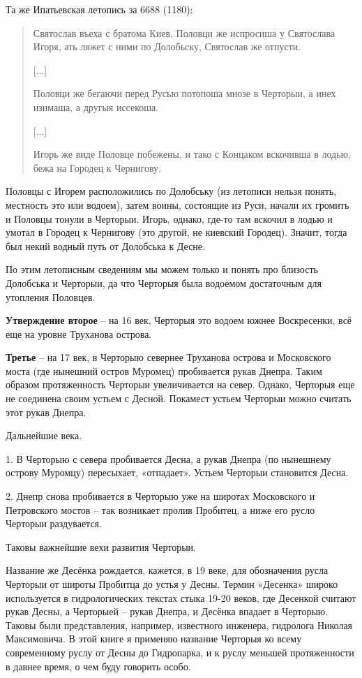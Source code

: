 Та же Ипатьевская летопись за 6688 (1180):

\begin{quotation}
Святослав въеха с братома  Киев. Половци же испросиша у Святослава Игоря, ать ляжет с ними по Долобьску, Святослав же отпусти.

[...]

Половци же бегаючи перед Русью потопоша мнозе в Черторыи, а инех изимаша, а другыя иссекоша.

[...]

Игорь же виде Половце побежены, и тако с Концаком вскочивша в лодью, бежа на Городец к Чернигову.\end{quotation}

Половцы с Игорем расположились по Долобську (из летописи нельзя понять, местность это или водоем), затем воины, состоящие из Руси, начали их громить и Половцы тонули в Черторыи. Игорь, однако, где-то там вскочил в лодью и умотал в Городец к Чернигову (это другой, не киевский Городец). Значит, тогда был некий водный путь от Долобська к Десне.

По этим летописным сведениям мы можем только и понять про близость Долобська и Черторыи, да что Черторыя была водоемом достаточным для утопления Половцев. %

\textbf{Утверждение второе} – на 16 век, Черторыя это водоем южнее Воскресенки, всё еще на уровне Труханова острова.

\textbf{Третье} – на 17 век, в Черторыю севернее Труханова острова и Московского моста (где нынешний остров Муромец) пробивается рукав Днепра. Таким образом протяженность Черторыи увеличивается на север. Однако, Черторыя еще не соединена своим устьем с Десной. Покамест устьем Черторыи можно считать этот рукав Днепра.

Дальнейшие века.

1. В Черторыю с севера пробивается Десна, а рукав Днепра (по нынешнему острову Муромцу) пересыхает, «отпадает». Устьем Черторыи становится Десна.

2. Днепр снова пробивается в Черторыю уже на широтах Московского и Петровского мостов – так возникает пролив Пробитец, а ниже его русло Черторыи раздувается.

Таковы важнейшие вехи развития Черторыи.

Название же Десёнка рождается, кажется, в 19 веке, для обозначения русла Черторыи от широты Пробитца до устья у Десны. Термин «Десенка» широко используется в гидрологических текстах стыка 19-20 веков, где Десенкой считают рукав Десны, а Черторыей – рукав Днепра, и Десёнка впадает в Черторыю. Таковы были представления, например, известного инженера, гидролога Николая Максимовича. В этой книге я применяю название Черторыя ко всему современному руслу от Десны до Гидропарка, и к руслу меньшей протяженности в давнее время, о чем буду говорить особо.

